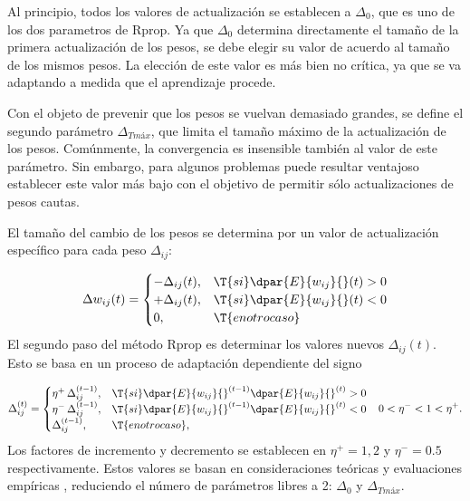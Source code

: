 Al principio, todos los valores de actualización se establecen a
$\Delta_0$, que es uno de los dos parametros de Rprop. Ya que
$\Delta_0$ determina directamente el tamaño de la primera
actualización de los pesos, se debe elegir su valor de acuerdo al
tamaño de los mismos pesos. La elección de este valor es más bien no
crítica, ya que se va adaptando a medida que el aprendizaje procede.

Con el objeto de prevenir que los pesos se vuelvan demasiado grandes,
se define el segundo parámetro $\Delta_{T{máx}}$, que limita el tamaño
máximo de la actualización de los pesos. Comúnmente, la convergencia
es insensible también al valor de este parámetro. Sin embargo, para
algunos problemas puede resultar ventajoso establecer este valor más bajo
con el objetivo de permitir sólo actualizaciones de pesos cautas.

El tamaño del cambio de los pesos se determina por un
valor de actualización específico para cada peso $\Delta_{ij}$:

\begin{align}
\label{mlp20}
  \Delta{}w_{ij}(t) = 
  \begin{cases}
    -\Delta_{ij}(t), & \T{si } \dpar{E}{w_{ij}}{}(t) > 0 \\
    +\Delta_{ij}(t), & \T{si } \dpar{E}{w_{ij}}{}(t) < 0 \\
    0, & \T{en otro caso}
  \end{cases}
\end{align}
El segundo paso del método Rprop es determinar los valores nuevos
$\Delta_{ij}(t)$. Esto se basa en un proceso de adaptación dependiente
del signo

\begin{align}
\label{mlp20}
  \Delta{}_{ij}^{(t)} = 
  \begin{cases}
    \eta^+\,\Delta_{ij}^{(t-1)}, & \T{si }\dpar{E}{w_{ij}}{}^{(t-1)}
      \dpar{E}{w_{ij}}{}^{(t)} > 0 \\
    \eta^-\,\Delta_{ij}^{(t-1)}, & \T{si }\dpar{E}{w_{ij}}{}^{(t-1)}
      \dpar{E}{w_{ij}}{}^{(t)} < 0 \\
    \Delta_{ij}^{(t-1)}, & \T{en otro caso},
  \end{cases}
  && 0<\eta^-<1<\eta^+.
\end{align}
Los factores de incremento y decremento se establecen en $\eta^+=1,2$
y $\eta^-=0.5$ respectivamente. Estos valores se basan en
consideraciones teóricas y evaluaciones empíricas \cite{riedmiller},
reduciendo el número de parámetros libres a 2: $\Delta_0$ y
$\Delta_{T{máx}}$.

